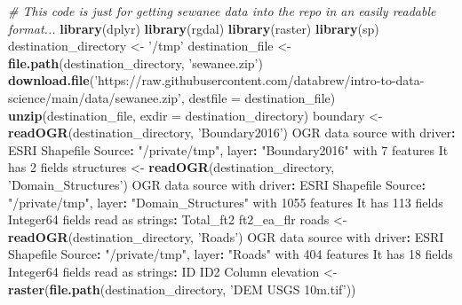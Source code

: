 \documentclass[
]{book}
\newenvironment{Shaded}{\begin{snugshade}}{\end{snugshade}}
\newcommand{\CommentTok}[1]{\textcolor[rgb]{0.56,0.35,0.01}{\textit{#1}}}
\newcommand{\DataTypeTok}[1]{\textcolor[rgb]{0.13,0.29,0.53}{#1}}
\newcommand{\DecValTok}[1]{\textcolor[rgb]{0.00,0.00,0.81}{#1}}
\newcommand{\KeywordTok}[1]{\textcolor[rgb]{0.13,0.29,0.53}{\textbf{#1}}}
\newcommand{\NormalTok}[1]{#1}
\newcommand{\OperatorTok}[1]{\textcolor[rgb]{0.81,0.36,0.00}{\textbf{#1}}}
\newcommand{\StringTok}[1]{\textcolor[rgb]{0.31,0.60,0.02}{#1}}
\begin{document}
\begin{Shaded}
\begin{Highlighting}[]

\CommentTok{# This code is just for getting sewanee data into the repo in an easily readable format...}
\KeywordTok{library}\NormalTok{(dplyr)}
\KeywordTok{library}\NormalTok{(rgdal)}
\KeywordTok{library}\NormalTok{(raster)}
\KeywordTok{library}\NormalTok{(sp)}
\NormalTok{destination_directory <-}\StringTok{ '/tmp'}
\NormalTok{destination_file <-}\StringTok{ }\KeywordTok{file.path}\NormalTok{(destination_directory, }\StringTok{'sewanee.zip'}\NormalTok{)}
\KeywordTok{download.file}\NormalTok{(}\StringTok{'https://raw.githubusercontent.com/databrew/intro-to-data-science/main/data/sewanee.zip'}\NormalTok{,}
              \DataTypeTok{destfile =}\NormalTok{ destination_file)}
\KeywordTok{unzip}\NormalTok{(destination_file, }\DataTypeTok{exdir =}\NormalTok{ destination_directory)}
\NormalTok{boundary <-}\StringTok{ }\KeywordTok{readOGR}\NormalTok{(destination_directory, }\StringTok{'Boundary2016'}\NormalTok{)}
\NormalTok{OGR data source with driver}\OperatorTok{:}\StringTok{ }\NormalTok{ESRI Shapefile }
\NormalTok{Source}\OperatorTok{:}\StringTok{ "/private/tmp"}\NormalTok{, layer}\OperatorTok{:}\StringTok{ "Boundary2016"}
\NormalTok{with }\DecValTok{7}\NormalTok{ features}
\NormalTok{It has }\DecValTok{2}\NormalTok{ fields}
\NormalTok{structures <-}\StringTok{ }\KeywordTok{readOGR}\NormalTok{(destination_directory, }\StringTok{'Domain_Structures'}\NormalTok{)}
\NormalTok{OGR data source with driver}\OperatorTok{:}\StringTok{ }\NormalTok{ESRI Shapefile }
\NormalTok{Source}\OperatorTok{:}\StringTok{ "/private/tmp"}\NormalTok{, layer}\OperatorTok{:}\StringTok{ "Domain_Structures"}
\NormalTok{with }\DecValTok{1055}\NormalTok{ features}
\NormalTok{It has }\DecValTok{113}\NormalTok{ fields}
\NormalTok{Integer64 fields read as strings}\OperatorTok{:}\StringTok{  }\NormalTok{Total_ft2 ft2_ea_flr }
\NormalTok{roads <-}\StringTok{ }\KeywordTok{readOGR}\NormalTok{(destination_directory, }\StringTok{'Roads'}\NormalTok{)}
\NormalTok{OGR data source with driver}\OperatorTok{:}\StringTok{ }\NormalTok{ESRI Shapefile }
\NormalTok{Source}\OperatorTok{:}\StringTok{ "/private/tmp"}\NormalTok{, layer}\OperatorTok{:}\StringTok{ "Roads"}
\NormalTok{with }\DecValTok{404}\NormalTok{ features}
\NormalTok{It has }\DecValTok{18}\NormalTok{ fields}
\NormalTok{Integer64 fields read as strings}\OperatorTok{:}\StringTok{  }\NormalTok{ID ID2 Column }
\NormalTok{elevation <-}\StringTok{ }\KeywordTok{raster}\NormalTok{(}\KeywordTok{file.path}\NormalTok{(destination_directory,}
                              \StringTok{'DEM USGS 10m.tif'}\NormalTok{))}
\end{Highlighting}
\end{Shaded}
\end{document}
